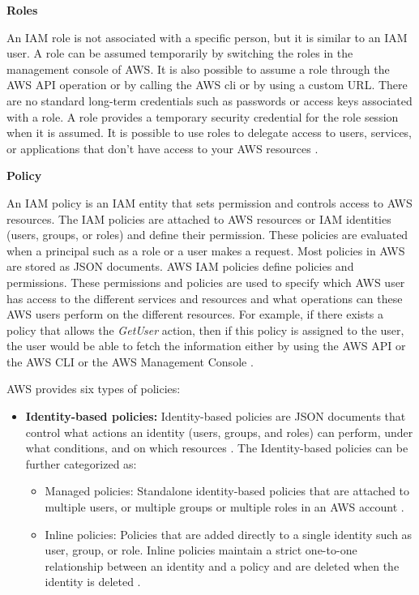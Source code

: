 \clearpage

\textbf{Roles}
\par An IAM role is not associated with a specific person,
but it is similar to an IAM user.
A role can be assumed
temporarily by switching the roles in the management
console of AWS. It is also possible to assume a role
through the AWS API operation or by calling the AWS
\gls{cli}
or by using a custom URL.
There are no standard long-term credentials such as passwords or access keys associated with a role.
A role provides a temporary security credential for the role session when it is assumed.
It is possible to use roles to delegate access to users, services, or applications that don't have access to your AWS resources \cite{27}.

\hfill \break
\textbf{Policy}

\par An IAM policy is an IAM entity that sets permission and controls access to AWS resources.
The IAM policies are attached to AWS resources or IAM identities (users, groups, or roles) and define their permission.
These policies are evaluated when a principal such as a role or a user makes a request.
Most policies in AWS are stored as JSON documents.
AWS IAM policies define policies and permissions.
These permissions and policies are used to
specify which AWS user has access to the different services
and resources and what
operations can these AWS users perform on the different
resources.
For example, if there exists a policy that allows the
\textit{GetUser} action, then if this policy is assigned to the
user, the user would be able to fetch the information either by using the AWS API or the AWS CLI or the AWS Management Console \cite{14}.

\par AWS provides six types of policies:

\begin{itemize}
    \item \textbf{Identity-based policies:} Identity-based policies are JSON documents that control what actions an
    identity
    (users, groups, and roles) can perform, under what conditions, and on which resources \cite{27}.
    The Identity-based policies can be further categorized as:
    \begin{itemize}
        \item Managed policies: Standalone identity-based
        policies that are attached to multiple users,
        or multiple groups or multiple roles in an AWS
        account
        \cite{27}.
    \end{itemize}
    \begin{itemize}
        \item Inline policies:  Policies that are added directly to a single identity such as user, group, or role.
        Inline policies maintain a strict one-to-one relationship between an identity and a policy and are deleted when the identity is deleted \cite{27}.
    \end{itemize}
\end{itemize}

